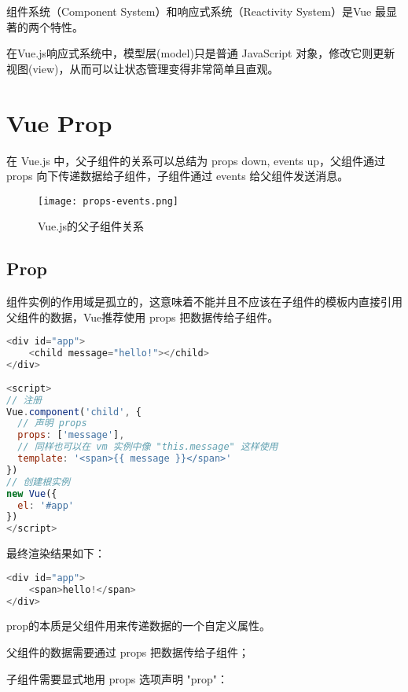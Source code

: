 组件系统（Component System）和响应式系统（Reactivity System）是Vue 最显著的两个特性。

在Vue.js响应式系统中，模型层(model)只是普通 JavaScript 对象，修改它则更新视图(view)，从而可以让状态管理变得非常简单且直观。



\chapter{Vue Prop}


在 Vue.js 中，父子组件的关系可以总结为 props down, events up，父组件通过 props 向下传递数据给子组件，子组件通过 events 给父组件发送消息。

\begin{figure}[htbp]
\centering
\texttt{[image: props-events.png]}
\caption{Vue.js的父子组件关系}
\end{figure}



\section{Prop}



组件实例的作用域是孤立的，这意味着不能并且不应该在子组件的模板内直接引用父组件的数据，Vue推荐使用 props 把数据传给子组件。


\begin{lstlisting}[language=JavaScript]
<div id="app">
    <child message="hello!"></child>
</div>
 
<script>
// 注册
Vue.component('child', {
  // 声明 props
  props: ['message'],
  // 同样也可以在 vm 实例中像 "this.message" 这样使用
  template: '<span>{{ message }}</span>'
})
// 创建根实例
new Vue({
  el: '#app'
})
</script>
\end{lstlisting}

最终渲染结果如下：


\begin{lstlisting}[language=JavaScript]
<div id="app">
    <span>hello!</span>
</div>
\end{lstlisting}

prop的本质是父组件用来传递数据的一个自定义属性。

\begin{compactitem}
\item 父组件的数据需要通过 props 把数据传给子组件；
\item 子组件需要显式地用 props 选项声明 "prop"：
\end{compactitem}


